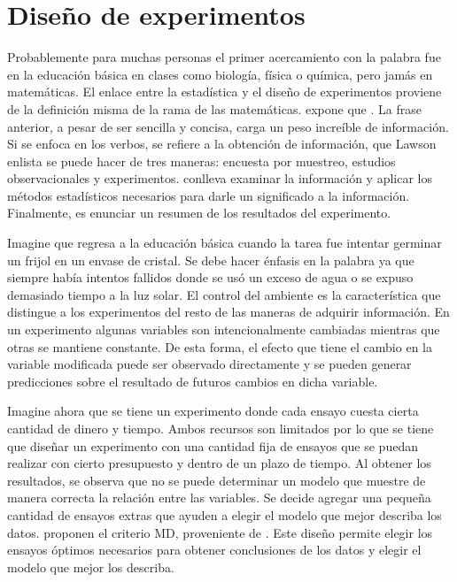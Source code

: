 \chapter{Diseño de experimentos} \label{chapter_MDopt}

Probablemente para muchas personas el primer acercamiento con la palabra  fue en la educación básica en clases como biología, física o química, pero jamás en matemáticas. El enlace entre la estadística y el diseño de experimentos proviene de la definición misma de la rama de las matemáticas. \cite{lawson2015design} expone que . La frase anterior, a pesar de ser sencilla y concisa, carga un peso increíble de información. Si se enfoca en los verbos,  se refiere a la obtención de información, que Lawson enlista se puede hacer de tres maneras: encuesta por muestreo, estudios observacionales y experimentos.  conlleva examinar la información y aplicar los métodos estadísticos necesarios para darle un significado a la información. Finalmente,  es enunciar un resumen de los resultados del experimento. 

Imagine que regresa a la educación básica cuando la tarea fue 
intentar germinar un frijol en un envase de cristal. Se debe hacer énfasis en la palabra  ya que siempre había intentos fallidos donde se usó un exceso de agua o se expuso demasiado tiempo a la luz solar. El control del ambiente es la característica que distingue a los experimentos del resto de las maneras de adquirir información. En un experimento algunas variables son intencionalmente cambiadas mientras que otras se mantiene constante. De esta forma, el efecto que tiene el cambio en la variable modificada puede ser observado directamente y se pueden generar predicciones sobre el resultado de futuros cambios en dicha variable. 

Imagine ahora que se tiene un experimento donde cada ensayo cuesta cierta cantidad de dinero y tiempo. Ambos recursos son limitados por lo que se tiene que diseñar un experimento con una cantidad fija de ensayos que se puedan realizar con cierto presupuesto y dentro de un plazo de tiempo. Al obtener los resultados, se observa que no se puede determinar un modelo que muestre de manera correcta la relación entre las variables. Se decide agregar una pequeña cantidad de ensayos extras que ayuden a elegir el modelo que mejor describa los datos. \cite{meyer1996} proponen el criterio MD, proveniente de . Este diseño permite elegir los ensayos óptimos necesarios para obtener conclusiones de los datos y elegir el modelo que mejor los describa. 

